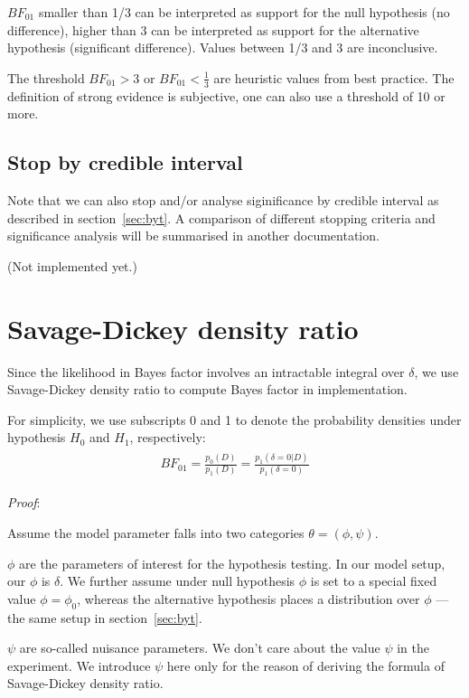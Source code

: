 \documentclass[paper=a4, fontsize=11pt]{scrartcl} %
\numberwithin{equation}{section} %
\numberwithin{figure}{section} %
\numberwithin{table}{section} %
\begin{document}
$BF_{01}$ smaller than 1/3 can be interpreted as support for the null hypothesis (no difference),  higher than 3 can be interpreted as support for the alternative hypothesis (significant difference).  Values between 1/3 and 3 are inconclusive. 

The threshold $BF_{01}  >3$ or $BF_{01}  < \frac{1}{3}$ are heuristic values from best practice. The definition of strong evidence is subjective, one can also use a threshold of 10 or more.

\subsection{Stop by credible interval}
Note that we can also stop and/or analyse siginificance by credible interval as described in section~\ref{sec:byt}. A comparison of different stopping criteria and significance analysis will be summarised in another documentation.

(Not implemented yet.)

\section{Savage-Dickey density ratio}
Since the likelihood in Bayes factor involves an intractable integral over $\delta$, we use Savage-Dickey density ratio to compute Bayes factor in implementation. 

For simplicity, we use subscripts 0 and 1 to denote the probability densities under hypothesis $H_0$ and $H_1$, respectively:
\begin{align}
\begin{split}
BF_{01} = \frac{p_0(D)}{p_1(D)} = \frac{p_1(\delta=0 | D)}{p_1(\delta=0)}
\end{split}
\end{align}

\emph{Proof}:

Assume the model parameter falls into two categories $\theta = (\phi, \psi)$.

$\phi$ are the parameters of interest for the hypothesis testing. In our model setup, our $\phi$ is $\delta$. We further assume under null hypothesis $\phi$ is set to a special fixed value $\phi = \phi_0$, whereas the alternative hypothesis places a distribution over $\phi$ --- the same setup in section~\ref{sec:byt}.

$\psi$ are so-called nuisance parameters. We don't care about the value $\psi$ in the experiment. We introduce $\psi$ here only for the reason of deriving the formula of Savage-Dickey density ratio. \\
\end{document}
